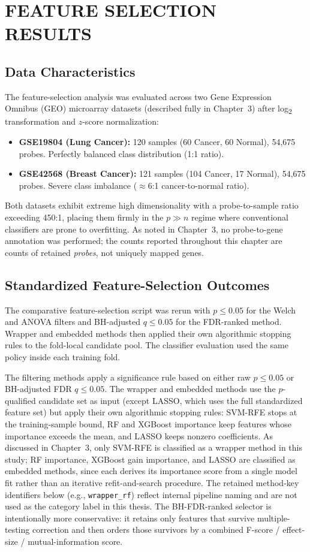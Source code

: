 \chapter{FEATURE SELECTION RESULTS}

\section{Data Characteristics}

The feature-selection analysis was evaluated across two Gene Expression Omnibus (GEO) microarray datasets (described fully in Chapter~3) after log\textsubscript{2} transformation and $z$-score normalization:
\begin{itemize}
    \item \textbf{GSE19804 (Lung Cancer):} 120 samples (60 Cancer, 60 Normal), 54,675 probes. Perfectly balanced class distribution (1:1 ratio).
    \item \textbf{GSE42568 (Breast Cancer):} 121 samples (104 Cancer, 17 Normal), 54,675 probes. Severe class imbalance ($\approx$6:1 cancer-to-normal ratio).
\end{itemize}
Both datasets exhibit extreme high dimensionality with a probe-to-sample ratio exceeding 450:1, placing them firmly in the $p \gg n$ regime where conventional classifiers are prone to overfitting. As noted in Chapter~3, no probe-to-gene annotation was performed; the counts reported throughout this chapter are counts of retained \emph{probes}, not uniquely mapped genes.

\section{Standardized Feature-Selection Outcomes}

The comparative feature-selection script was rerun with $p \leq 0.05$ for the Welch and ANOVA filters and BH-adjusted $q \leq 0.05$ for the FDR-ranked method. Wrapper and embedded methods then applied their own algorithmic stopping rules to the fold-local candidate pool. The classifier evaluation used the same policy inside each training fold.

The filtering methods apply a significance rule based on either raw $p \leq 0.05$ or BH-adjusted FDR $q \leq 0.05$. The wrapper and embedded methods use the $p$-qualified candidate set as input (except LASSO, which uses the full standardized feature set) but apply their own algorithmic stopping rules: SVM-RFE stops at the training-sample bound, RF and XGBoost importance keep features whose importance exceeds the mean, and LASSO keeps nonzero coefficients. As discussed in Chapter~3, only SVM-RFE is classified as a wrapper method in this study; RF importance, XGBoost gain importance, and LASSO are classified as embedded methods, since each derives its importance score from a single model fit rather than an iterative refit-and-search procedure. The retained method-key identifiers below (e.g., \texttt{wrapper\_rf}) reflect internal pipeline naming and are not used as the category label in this thesis. The BH-FDR-ranked selector is intentionally more conservative: it retains only features that survive multiple-testing correction and then orders those survivors by a combined F-score / effect-size / mutual-information score.

